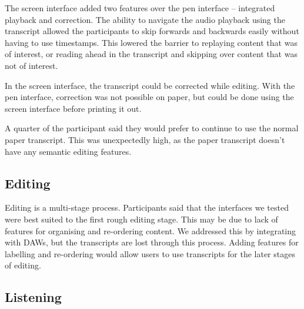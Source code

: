 The screen interface added two features over the pen interface -- integrated playback and correction. The ability to
navigate the audio playback using the transcript allowed the participants to skip forwards and backwards easily
without having to use timestamps. This lowered the barrier to replaying content that was of interest, or reading ahead
in the transcript and skipping over content that was not of interest.

In the screen interface, the transcript could be corrected while editing. With the pen interface, correction was not
possible on paper, but could be done using the screen interface before printing it out.

A quarter of the participant said they would prefer to continue to use the normal paper transcript. This was
unexpectedly high, as the paper transcript doesn't have any semantic editing features.




\subsection{Editing}

Editing is a multi-stage process. Participants said that the interfaces we tested were best suited to the first rough
editing stage. This may be due to lack of features for organising and re-ordering content. We addressed this by
integrating with DAWs, but the transcripts are lost through this process. Adding features for labelling and re-ordering
would allow users to use transcripts for the later stages of editing.

\subsection{Listening}

